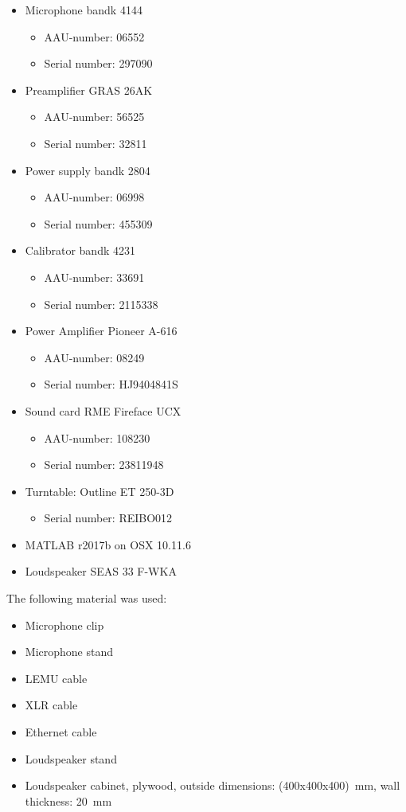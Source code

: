 \begin{itemize}[noitemsep]
\item Microphone \gls{bandk} 4144
\begin{itemize}[noitemsep]
\item AAU-number: 06552
\item Serial number: 297090
\end{itemize}
\item Preamplifier GRAS 26AK
\begin{itemize}[noitemsep]
\item AAU-number: 56525
\item Serial number: 32811
\end{itemize}
\item Power supply \gls{bandk} 2804
\begin{itemize}
\item AAU-number: 06998
\item Serial number: 455309
\end{itemize}
\item Calibrator \gls{bandk} 4231
\begin{itemize}[noitemsep]
\item AAU-number: 33691
\item Serial number: 2115338
\end{itemize}
\item Power Amplifier Pioneer A-616
\begin{itemize}[noitemsep]
\item AAU-number: 08249
\item Serial number: HJ9404841S
\end{itemize}
\item Sound card RME Fireface UCX
\begin{itemize}[noitemsep]
\item AAU-number: 108230
\item Serial number: 23811948
\end{itemize}
\item Turntable: Outline ET 250-3D
\begin{itemize}
\item Serial number: REIBO012
\end{itemize}
\item MATLAB r2017b on OSX 10.11.6
\item Loudspeaker SEAS 33 F-WKA
\end{itemize}

The following material was used:
\begin{itemize}[noitemsep]
\item Microphone clip
\item Microphone stand
\item LEMU cable
\item XLR cable
\item Ethernet cable
\item Loudspeaker stand
\item Loudspeaker cabinet, plywood, outside dimensions: (400x400x400)\SI{}{\milli\meter}, wall thickness: \SI{20}{\milli\meter}
\end{itemize}

